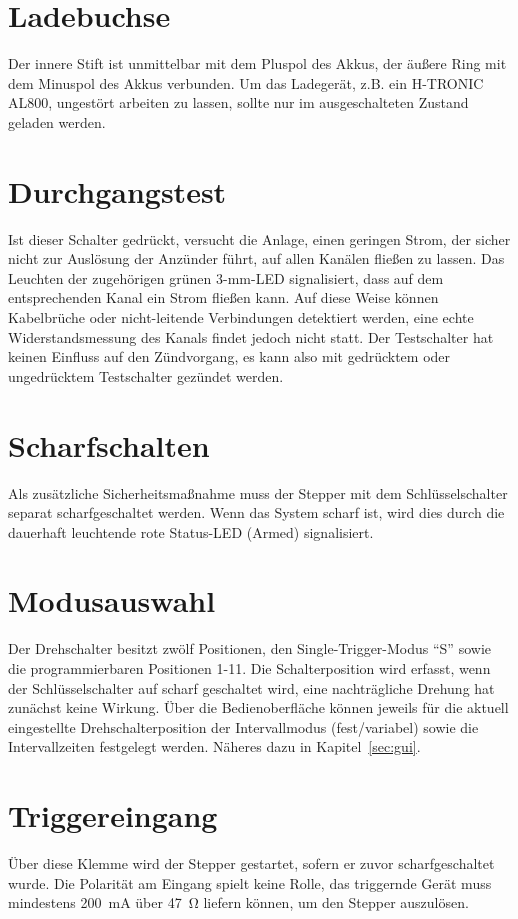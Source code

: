 \documentclass[paper=a4, open=any, numbers=noenddot]{scrbook}
\begin{document}
		\section{Ladebuchse}

			Der innere Stift ist unmittelbar mit dem Pluspol des Akkus, der äußere Ring mit dem Minuspol des Akkus verbunden. Um das Ladegerät, z.B. ein H-TRONIC AL800, ungestört arbeiten zu lassen, sollte nur im ausgeschalteten Zustand geladen werden.

		\section{Durchgangstest}

			Ist dieser Schalter gedrückt, versucht die Anlage, einen geringen Strom, der sicher nicht zur Auslösung der Anzünder führt, auf allen Kanälen fließen zu lassen. Das Leuchten der zugehörigen grünen 3-mm-LED signalisiert, dass auf dem entsprechenden Kanal ein Strom fließen kann. Auf diese Weise können Kabelbrüche oder nicht-leitende Verbindungen detektiert werden, eine echte Widerstandsmessung des Kanals findet jedoch nicht statt. Der Testschalter hat keinen Einfluss auf den Zündvorgang, es kann also mit gedrücktem oder ungedrücktem Testschalter gezündet werden.

		\section{Scharfschalten}

			Als zusätzliche Sicherheitsmaßnahme muss der Stepper mit dem Schlüsselschalter separat scharfgeschaltet werden. Wenn das System scharf ist, wird dies durch die dauerhaft leuchtende rote Status-LED (Armed) signalisiert.

		\section{Modusauswahl}
			Der Drehschalter besitzt zwölf Positionen, den Single-Trigger-Modus \enquote{S} sowie die programmierbaren Positionen 1-11. Die Schalterposition wird erfasst, wenn der Schlüsselschalter auf scharf geschaltet wird, eine nachträgliche Drehung hat zunächst keine Wirkung. Über die Bedienoberfläche können jeweils für die aktuell eingestellte Drehschalterposition der Intervallmodus (fest/variabel) sowie die Intervallzeiten festgelegt werden. Näheres dazu in Kapitel~\ref{sec:gui}.

		\section{Triggereingang}
			Über diese Klemme wird der Stepper gestartet, sofern er zuvor scharfgeschaltet wurde. Die Polarität am Eingang spielt keine Rolle, das triggernde Gerät muss mindestens \SI{200}{\milli\ampere} über \SI{47}{\ohm} liefern können, um den Stepper auszulösen.
\end{document}
